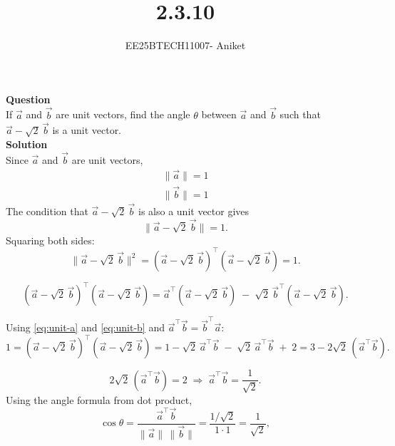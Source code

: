 \documentclass[journal]{IEEEtran}
\begin{document}
\title{2.3.10}
\author{EE25BTECH11007- Aniket}
\maketitle
{\let\newpage\relax\maketitle}

\setlength{\intextsep}{10pt}
\textbf{Question}\\
If $\vec a$ and $\vec b$ are unit vectors, find the angle $\theta$ between $\vec a$ and $\vec b$
such that $\vec a-\sqrt{2}\,\vec b$ is a unit vector.\\

\textbf{Solution}\\
Since $\vec a$ and $\vec b$ are unit vectors,
\begin{gather}
\lVert \vec a \rVert = 1 \label{eq:unit-a}\\
\lVert \vec b \rVert = 1 \label{eq:unit-b}
\end{gather}
The condition that $\vec a-\sqrt{2}\,\vec b$ is also a unit vector gives
\begin{equation}
\big\lVert \vec a-\sqrt{2}\,\vec b \big\rVert = 1.
\label{eq:unit-cond}
\end{equation}
Squaring both sides:
\begin{equation}
\big\lVert \vec a-\sqrt{2}\,\vec b\big\rVert^{2}
= (\vec a-\sqrt{2}\,\vec b)^{\top}(\vec a-\sqrt{2}\,\vec b)=1.
\label{eq:norm-squared}
\end{equation}

\begin{equation}
(\vec a-\sqrt{2}\,\vec b)^{\top}(\vec a-\sqrt{2}\,\vec b)
= \vec a^{\top}(\vec a-\sqrt{2}\,\vec b)
\;-\;\sqrt{2}\,\vec b^{\top}(\vec a-\sqrt{2}\,\vec b).
\label{eq:distribute-outer}
\end{equation}

Using \eqref{eq:unit-a} and \eqref{eq:unit-b} and $\vec a^{\top}\vec b=\vec b^{\top}\vec a$:
\begin{equation}
1=(\vec a-\sqrt{2}\,\vec b)^{\top}(\vec a-\sqrt{2}\,\vec b)
= 1 -\sqrt{2}\,\vec a^{\top}\vec b \;-\;\sqrt{2}\,\vec a^{\top}\vec b \;+\;2
= 3 - 2\sqrt{2}\,(\vec a^{\top}\vec b).
\label{eq:combine}
\end{equation}

\begin{equation}
2\sqrt{2}\,(\vec a^{\top}\vec b)=2
\;\Longrightarrow\;
\vec a^{\top}\vec b=\frac{1}{\sqrt{2}}.
\label{eq:atb}
\end{equation}
Using the angle formula from dot product,
\begin{equation}
\cos\theta=\frac{\vec a^{\top}\vec b}{\lVert\vec a\rVert\,\lVert\vec b\rVert}
=\frac{1/\sqrt{2}}{1\cdot 1}=\frac{1}{\sqrt{2}},
\label{eq:costheta}
\end{equation}
\end{document}
